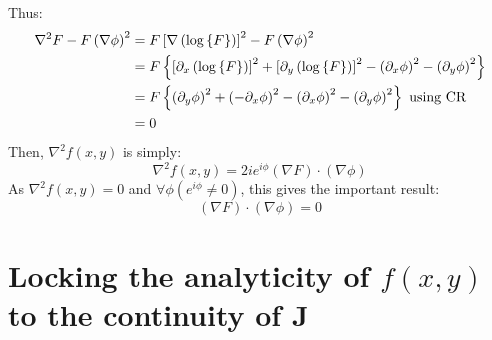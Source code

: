 \documentclass{article}
\begin{document}
Thus:
\begin{align}
    \nabla^2 F - F \left( \nabla \phi \right)^2 &= F \left[ \nabla \left( \log \left\{ F \right\}
        \right) \right]^2 - F \left( \nabla \phi \right)^2 \\
    &= F \left\{ \left[ \partial_x \left( \log \left\{ F \right\} \right) \right]^2
       + \left[ \partial_y \left( \log \left\{ F \right\} \right) \right]^2
       - \left( \partial_x \phi \right)^2
       - \left( \partial_y \phi \right)^2 \right\} \\
    &= F \left\{ \left( \partial_y \phi \right)^2
       + \left( - \partial_x \phi \right)^2
       - \left( \partial_x \phi \right)^2
       - \left( \partial_y \phi \right)^2 \right\} ~\textrm{using CR}\\
    &= 0
\end{align}
Then, $\nabla^2 f(x,y)$ is simply:
\begin{equation}
    \nabla^2 f(x,y) = 2 i e^{i \phi} \left( \nabla F \right) \cdot \left( \nabla
        \phi \right)
\end{equation}
As $\nabla^2 f(x,y) = 0$ and $\forall \phi \left( e^{i \phi} \neq 0 \right)$,
this gives the important result:
\begin{equation}
    \left( \nabla F \right) \cdot \left( \nabla \phi \right) = 0
\end{equation}

\section{Locking the analyticity of $f(x,y)$ to the continuity of $\mathbf{J}$}
\end{document}
